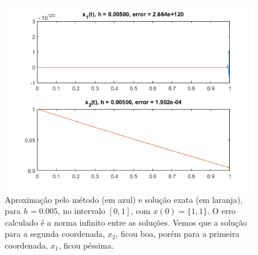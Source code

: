 \documentclass{article}
\begin{document}
\begin{enumerate}
\begin{enumerate}
                \begin{figure}[!h]
                    \centering
                    \includegraphics[width=\textwidth]{forward_1.png}
                    \caption{Aproximação pelo método (em azul) e
                    solução exata (em laranja), para $h = 0.005$,
                    no intervalo $[0, 1]$, com $x(0) = \{1, 1\}$.
                    O erro calculado é a norma infinito entre as
                    soluções. Vemos que a solução para a segunda
                    coordenada, $x_2$, ficou boa, porém para a primeira
                    coordenada, $x_1$, ficou péssima.}
                    \label{fig:forward_1}
                \end{figure}
                

\end{enumerate}
\end{enumerate}
\end{document}
